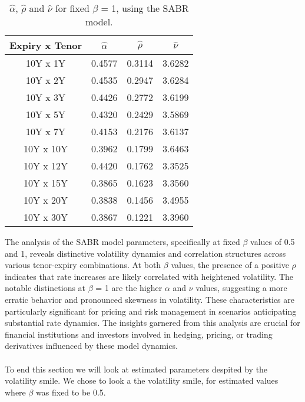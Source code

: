 \noindent

\begin{table}[H]
    \centering
    \begin{tabular}{cccc}
      \toprule
      \textbf{Expiry x Tenor} & \textbf{$\hat{\alpha}$} & \textbf{$\hat{\rho}$}  & \textbf{$\hat{\nu}$}\\
      \midrule
      \rowcolor{lightgray!40} 10Y x 1Y &0.4577 & 0.3114 & 3.6282 \\
      10Y x 2Y  &0.4535 & 0.2947 & 3.6284 \\
      \rowcolor{lightgray!40} 10Y x 3Y  &0.4426 & 0.2772 & 3.6199\\
      10Y x 5Y  &0.4320 & 0.2429 & 3.5869 \\
      \rowcolor{lightgray!40} 10Y x 7Y  &0.4153 & 0.2176 & 3.6137 \\
      10Y x 10Y &0.3962& 0.1799 & 3.6463 \\
      \rowcolor{lightgray!40} 10Y x 12Y &0.4420 & 0.1762 & 3.3525\\
      10Y x 15Y & 0.3865 & 0.1623 & 3.3560 \\
      \rowcolor{lightgray!40} 10Y x 20Y &0.3838 & 0.1456 & 3.4955 \\
      10Y x 30Y &0.3867 & 0.1221 & 3.3960 \\
      \bottomrule
    \end{tabular}
    \caption{$\hat{\alpha}$, $\hat{\rho}$ and $\hat{\nu}$ for fixed $\beta$ = 1, using the SABR model.}
    \label{tab:beta_1}
\end{table}
\noindent
The analysis of the SABR model parameters, specifically at fixed $\beta$ values of 0.5 and 1, 
reveals distinctive volatility dynamics and correlation structures across various tenor-expiry combinations. 
At both $\beta$ values, the presence of a positive $\rho$ indicates that rate increases are likely correlated with heightened volatility.
The notable distinctions at $\beta$ = 1 are the higher $\alpha$ and $\nu$ values, suggesting a more erratic behavior and pronounced 
skewness in volatility. These characteristics are particularly significant for pricing and risk management in scenarios 
anticipating substantial rate dynamics. The insights garnered from this analysis are crucial for financial institutions and 
investors involved in hedging, pricing, or trading derivatives influenced by these model dynamics.
\\\\
To end this section we will look at estimated parameters despited by the volatility smile. 
We chose to look a the volatility smile, for estimated values where $\beta$ was fixed to be 0.5. 
